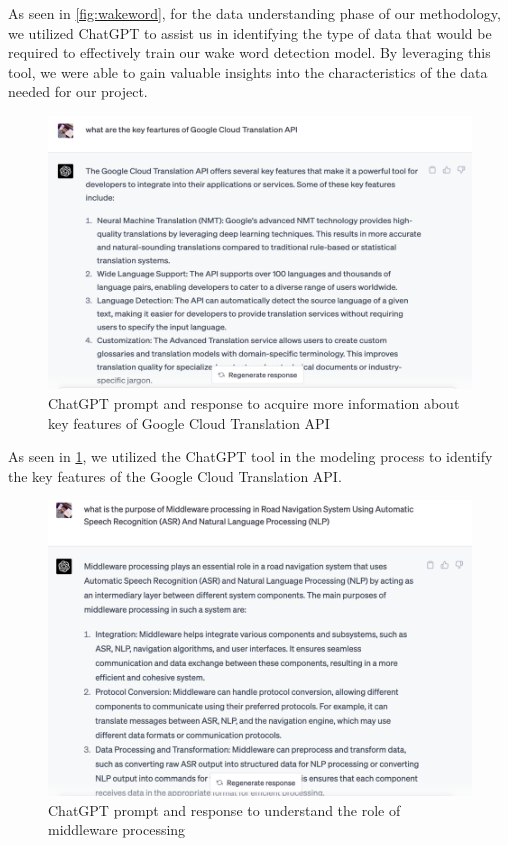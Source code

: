 \documentclass{epsrc}
\begin{document}
As seen in \ref{fig:wakeword}, for the data understanding phase of our methodology, we utilized ChatGPT to assist us in identifying the type of data that would be required to effectively train our wake word detection model. By leveraging this tool, we were able to gain valuable insights into the characteristics of the data needed for our project.
\vspace{5pt}

\begin{figure}[hbtp]
    \centering
    \includegraphics[width = 13.5cm]{Google Trans API.png}
    \caption{ChatGPT prompt and response to acquire more information about key features of Google Cloud Translation API}
    \label{fig:translationapi}
\end{figure}
\vspace{5pt}

As seen in \ref{fig:translationapi}, we utilized the ChatGPT tool in the modeling process to identify the key features of the Google Cloud Translation API.
\vspace{5pt}

\begin{figure}[hbtp]
    \centering
    \includegraphics[width = 13.5cm]{Middleware.png}
    \caption{ChatGPT prompt and response to understand the role of middleware processing}
    \label{fig:middleware}
\end{figure}
\vspace{5pt}
\end{document}

